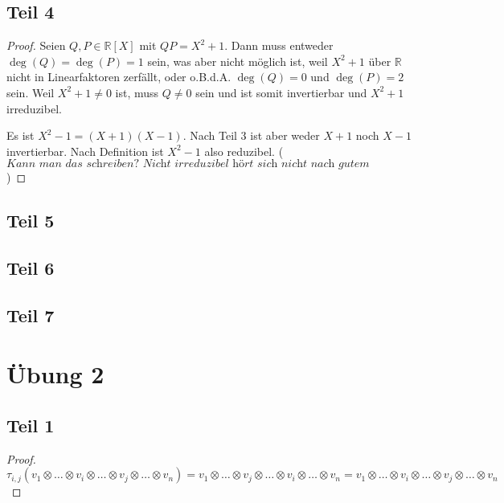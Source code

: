 \documentclass[10pt,a4paper]{article}
\begin{document}
\subsection*{Teil 4}

\begin{proof}
Seien $Q, P \in \mathbb{R}[X]$ mit $QP = X^{2} + 1$.
Dann muss entweder $\deg(Q) = \deg(P) = 1$ sein, was aber nicht möglich ist, weil $X^{2} + 1$ über $\mathbb{R}$ nicht in Linearfaktoren zerfällt, oder o.B.d.A. $\deg(Q) = 0$ und $\deg(P) = 2$ sein.
Weil $X^{2} + 1 \ne 0$ ist, muss $Q \ne 0$ sein und ist somit invertierbar und $X^{2} + 1$ irreduzibel.

Es ist $X^{2} - 1 = (X + 1)(X - 1)$.
Nach Teil 3 ist aber weder $X + 1$ noch $X - 1$ invertierbar.
Nach Definition ist $X^{2} - 1$ also reduzibel. ($\textit{Kann man das schreiben? Nicht irreduzibel hört sich nicht nach gutem Deutsch an.}$)
\end{proof}

\subsection*{Teil 5}

\subsection*{Teil 6}

\subsection*{Teil 7}

\section*{Übung 2}

\subsection*{Teil 1}

\begin{proof}
\begin{equation}
\tau_{i, j}(v_{1} \otimes \dots \otimes v_{i} \otimes \dots \otimes v_{j} \otimes \dots \otimes v_{n}) = v_{1} \otimes \dots \otimes v_{j} \otimes \dots \otimes v_{i} \otimes \dots \otimes v_{n} = v_{1} \otimes \dots \otimes v_{i} \otimes \dots \otimes v_{j} \otimes \dots \otimes v_{n}
\end{equation}


\end{proof}
\end{document}
